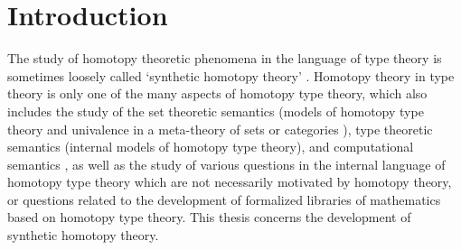 \chapter{Introduction}

The study of homotopy theoretic phenomena in the language of type theory \cite{hottbook} is 
sometimes loosely called `synthetic homotopy theory' \cite{Brunerie16}. 
Homotopy theory in type theory \cite{Awodey12} is only one of the
many aspects of homotopy type theory, which also includes the study of the
set theoretic semantics (models of homotopy type theory and univalence in a
meta-theory of sets or categories \cite{Awodey14,AwodeyWarren,BezemCoquandHuber,KapulkinLeFanuLumsdaine,Shulman15,Voevodsky15}), type theoretic semantics (internal models of homotopy type
theory), and computational semantics \cite{AngiuliHarperWilson}, as well as the study of various questions
in the internal language of homotopy type theory which are not necessarily 
motivated by homotopy theory, or questions related to the development of
formalized libraries of mathematics based on homotopy type theory.
This thesis concerns the development of synthetic homotopy theory.

